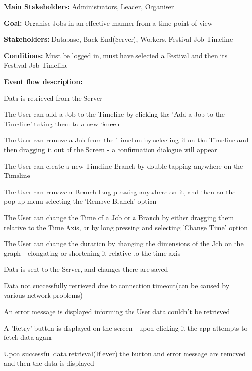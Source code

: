 			\noindent {}
			\begin{packed_item}
				\item \textbf{Main Stakeholders:} Administrators, Leader, Organiser
				\item \textbf{Goal:} Organise Jobs in an effective manner from a time point of view
				\item \textbf{Stakeholders: } Database, Back-End(Server), Workers, Festival Job Timeline
				\item \textbf{Conditions: } Must be logged in, must have selected a Festival and then its Festival Job Timeline
				\item \textbf{Event flow description: }
				\begin{packed_enum}
					\item Data is retrieved from the Server
					\item The User can add a Job to the Timeline by clicking the 'Add a Job to the Timeline' taking them to a new Screen
					\item The User can remove a Job from the Timeline by selecting it on the Timeline and then dragging it out of the Screen - a confirmation dialogue will appear
					\item The User can create a new Timeline Branch by double tapping anywhere on the Timeline
					\item The User can remove a Branch long pressing anywhere on it, and then on the pop-up menu selecting the 'Remove Branch' option
					\item The User can change the Time of a Job or a Branch by either dragging them relative to the Time Axis, or by long pressing and selecting 'Change Time' option
					\item The User can change the duration by changing the dimensions of the Job on the graph - elongating or shortening it relative to the time axis
					\item Data is sent to the Server, and changes there are saved
				\end{packed_enum}
				
				\begin{packed_item}
					\item[1.a] Data not successfully retrieved due to connection timeout(can be caused by various network problems)
					\item[] \begin{packed_enum}
						\item An error message is displayed informing the User data couldn't be retrieved
						\item A 'Retry' button is displayed on the screen - upon clicking it the app attempts to fetch data again
						\item Upon successful data retrieval(If ever) the button and error message are removed and then the data is displayed
					\end{packed_enum}
					

\end{packed_item}
\end{packed_item}
